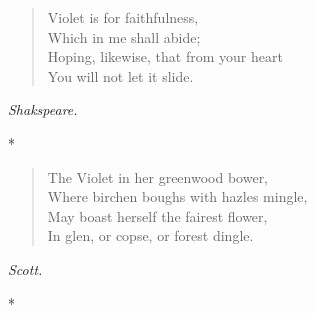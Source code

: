 \documentclass[11pt,twoside]{article}
\newcommand\stars{\begin{center}*\quad*\quad*\end{center}}
\newcommand\by[1]{\par\hfill\textit{#1}\par}
\begin{document}
\begin{verse}
Violet is for faithfulness,\\
\quad Which in me shall abide;\\
Hoping, likewise, that from your heart\\
\quad You will not let it slide.
\end{verse}

\by{Shakspeare.}

\stars

\begin{verse}
The Violet in her greenwood bower,\\
\quad Where birchen boughs with hazles mingle,\\
May boast herself the fairest flower,\\
\quad In glen, or copse, or forest dingle.
\end{verse}

\by{Scott.}

\stars
\end{document}
